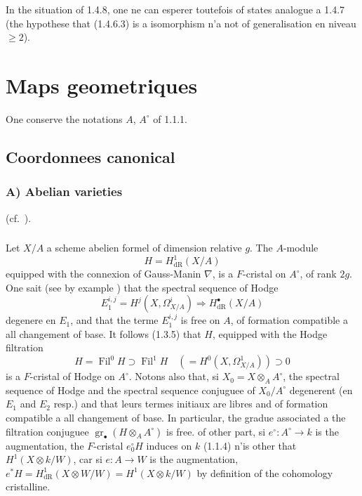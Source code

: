 \documentclass[12pt,a4paper]{article}
\theoremstyle{plain}
\theoremstyle{definition}
\theoremstyle{remark}
\DeclareMathOperator{\Fil}{Fil}
\DeclareMathOperator{\gr}{gr}
\begin{document}
In the situation of 1.4.8, one ne can esperer toutefois of states analogue a 1.4.7 (the hypothese that (1.4.6.3) is a isomorphism n'a not of generalisation en niveau $\geqslant 2$).

\section{Maps geometriques}

One conserve the notations $A$, $A^\circ$ of 1.1.1.

\subsection{Coordonnees canonical}

\subsubsection{A) Abelian varieties} (cf.\ \cite[\S 8]{Katz1973}).

\setcounter{subsubsection}{0}
\renewcommand{\thesubsubsection}{\thesubsection.\arabic{subsubsection}}

\subsubsection{}
Let $X/A$ a scheme abelien formel of dimension relative $g$. The $A$-module
\[
H = H^1_\mathrm{dR}(X/A)
\]
equipped with the connexion of Gauss-Manin $\nabla$, is a $F$-cristal on $A^\circ$, of rank $2g$. One sait (see by example \cite[Addendum]{MazurMessing}) that the spectral sequence of Hodge
\[
E^{i,j}_1 = H^j(X, \Omega^i_{X/A}) \Longrightarrow H^\bullet_\mathrm{dR}(X/A)
\]
degenere en $E_1$, and that the terme $E^{i,j}_1$ is free on $A$, of formation compatible a all changement of base. It follows (1.3.5) that $H$, equipped with the Hodge filtration
\[
H = \Fil^0 H \supset \Fil^1 H \quad (= H^0(X, \Omega^1_{X/A})) \supset 0
\]
is a $F$-cristal of Hodge on $A^\circ$. Notons also that, si $X_0 = X \otimes_A A^\circ$, the spectral sequence of Hodge and the spectral sequence conjuguee of $X_0/A^\circ$ degenerent (en $E_1$ and $E_2$ resp.) and that leurs termes initiaux are libres and of formation compatible a all changement of base. In particular, the gradue associated a the filtration conjuguee $\gr_\bullet(H \otimes_A A^\circ)$ is free. of other part, si $e^\circ : A^\circ \to k$ is the augmentation, the $F$-cristal $e^\circ_0 H$ induces on $k$ (1.1.4) n'is other that $H^1(X \otimes k/W)$, car si $e : A \to W$ is the augmentation, $e^*H = H^1_\mathrm{dR}(X \otimes W/W) = H^1(X \otimes k/W)$ by definition of the cohomology cristalline.
\end{document}
